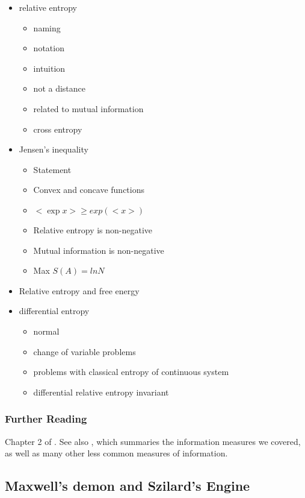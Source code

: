 \documentclass[Lectures.tex]{subfiles}
\begin{document}
\begin{itemize}

\item relative entropy
\begin{itemize}
	\item  naming
	\item notation
	\item  intuition
	\item  not a distance
	\item  related to mutual information
	\item  cross entropy
\end{itemize}
\item Jensen’s inequality
\begin{itemize}
	\item	 Statement
	\item Convex and concave functions
	\item $<\exp x> \ge exp(<x>)$
	\item Relative entropy is non-negative
	\item Mutual information is non-negative
	\item Max $S(A) = ln N$
\end{itemize}

\item Relative entropy and free energy
\item differential entropy
\begin{itemize}
	\item normal
	\item change of variable problems
	\item problems with classical entropy of continuous system
	\item differential relative entropy invariant
\end{itemize}
\end{itemize}
\subsubsection*{Further Reading}
Chapter 2 of . See also , which summaries the information measures we covered, as well as many other less common measures of information.


\subsection{Maxwell's demon and Szilard's Engine}
\end{document}
